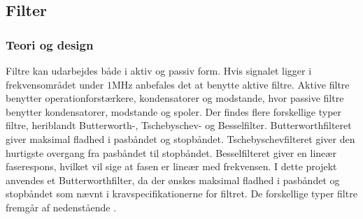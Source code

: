 \subsection{Filter}
\subsubsection{Teori og design}
Filtre kan udarbejdes både i aktiv og passiv form. Hvis signalet ligger i frekvensområdet under $1$MHz anbefales det at benytte aktive filtre. Aktive filtre benytter operationforstærkere, kondensatorer og modstande, hvor passive filtre benytter kondensatorer, modstande og spoler. \cite{Carter2013} Der findes flere forskellige typer filtre, heriblandt Butterworth-, Tschebyschev- og Besselfilter. Butterworthfilteret giver maksimal fladhed i pasbåndet og stopbåndet. Tschebyschevfilteret giver den hurtigste overgang fra pasbåndet til stopbåndet. Besselfilteret giver en lineær faserespons, hvilket vil sige at fasen er lineær med frekvensen. \cite{Carter2013} I dette projekt anvendes et Butterworthfilter, da der ønskes maksimal fladhed i pasbåndet og stopbåndet som nævnt i kravspecifikationerne for filtret. De forskellige typer filtre fremgår af nedenstående . 

